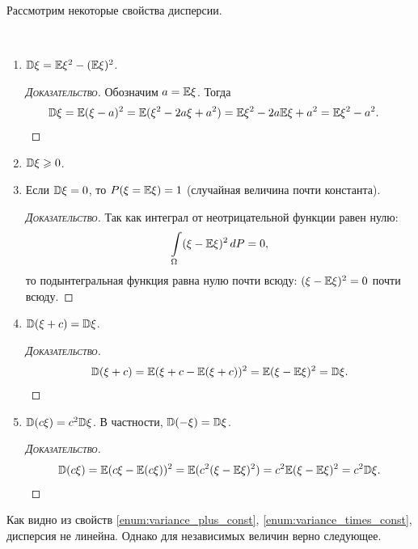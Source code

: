 \documentclass[../main.tex]{subfiles}
\begin{document}
Рассмотрим некоторые свойства дисперсии.
\begin{prop}\
 \begin{enumerate}
  \item $ \mathbb D\xi = \mathbb E\xi^{2} - (\mathbb E\xi)^{2} $.
   \begin{proof}[\normalfont\textsc{Доказательство}]
    Обозначим $ a = \mathbb E\xi $. Тогда
    \begin{align*}
     \mathbb D\xi &= \mathbb E(\xi - a)^{2} = \mathbb E(\xi^{2} - 2a\xi + a^{2}) = \mathbb E\xi^{2} - 2a\mathbb E\xi + a^{2} = \mathbb E\xi^{2} - a^{2}.
    \end{align*}
   \end{proof}
  \item $ \mathbb D\xi \geqslant 0 $.
  \item Если $ \mathbb D\xi = 0 $, то $ P(\xi = \mathbb E\xi) = 1 $ (случайная величина почти константа).
   \begin{proof}[\normalfont\textsc{Доказательство}]
    Так как интеграл от неотрицательной функции равен нулю:
    \begin{align*}
     \int\limits_{\Omega} (\xi-\mathbb E\xi)^{2} \,dP = 0,
    \end{align*} то подынтегральная функция равна нулю почти всюду: $ (\xi - \mathbb E\xi)^{2} = 0 $ почти всюду.
   \end{proof}
  \item \label{enum:variance_plus_const} $ \mathbb D(\xi + c) = \mathbb D\xi $.
   \begin{proof}[\normalfont\textsc{Доказательство}]
    \begin{align*}
     \mathbb D(\xi + c) = \mathbb E(\xi + c - \mathbb E(\xi + c))^{2} = \mathbb E(\xi - \mathbb E\xi)^{2} = \mathbb D\xi.
    \end{align*}
   \end{proof}
  \item \label{enum:variance_times_const} $ \mathbb D(c\xi) = c^{2}\mathbb D\xi $. В частности, $ \mathbb D(-\xi) = \mathbb D\xi $.
   \begin{proof}[\normalfont\textsc{Доказательство}]
    \begin{align*}
     \mathbb D(c\xi) = \mathbb E(c\xi - \mathbb E(c\xi))^{2} = \mathbb E (c^{2}(\xi - \mathbb E\xi)^{2}) = c^{2}\mathbb E(\xi-\mathbb E\xi)^{2} = c^{2}\mathbb D\xi.
    \end{align*}
   \end{proof}
 \end{enumerate}
\end{prop}

Как видно из свойств \ref{enum:variance_plus_const}, \ref{enum:variance_times_const}, дисперсия не линейна. Однако для независимых величин верно следующее.
\end{document}
